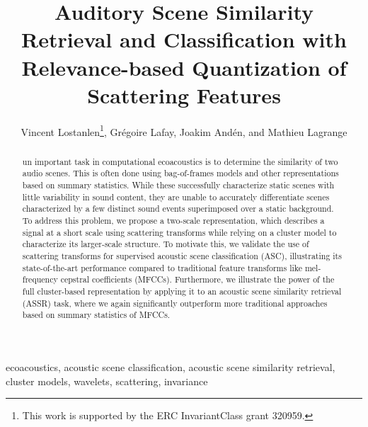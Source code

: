 \documentclass[journal]{IEEEtran}
\begin{document}
%
\title{Auditory Scene Similarity Retrieval and Classification with Relevance-based Quantization of Scattering Features}

\author{Vincent Lostanlen\thanks{This work is supported by the ERC InvariantClass grant 320959.}, Gr\'egoire Lafay, Joakim And\'en, and Mathieu Lagrange}


\maketitle

\begin{abstract}

un important task in computational ecoacoustics is to determine the similarity of two audio scenes. This is often done using bag-of-frames models and other representations based on summary statistics. While these successfully characterize static scenes with little variability in sound content, they are unable to accurately differentiate scenes characterized by a few distinct sound events superimposed over a static background. To address this problem, we propose a two-scale representation, which describes a signal at a short scale using scattering transforms while relying on a cluster model to characterize its larger-scale structure. To motivate this, we validate the use of scattering transforms for supervised acoustic scene classification (ASC), illustrating its state-of-the-art performance compared to traditional feature transforms like mel-frequency cepstral coefficients (MFCCs). Furthermore, we illustrate the power of the full cluster-based representation by applying it to an acoustic scene similarity retrieval (ASSR) task, where we again significantly outperform more traditional approaches based on summary statistics of MFCCs.

\end{abstract}

\begin{IEEEkeywords}
ecoacoustics, acoustic scene classification, acoustic scene similarity retrieval, cluster models, wavelets, scattering, invariance
\end{IEEEkeywords}
\end{document}
